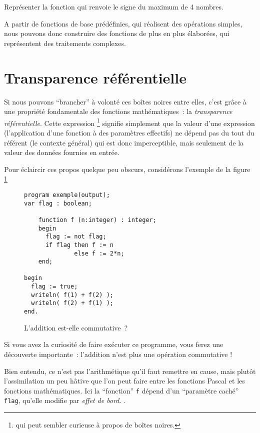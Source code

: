 \begin{exercice} Représenter la fonction qui renvoie le signe 
du maximum de 4 nombres.
\end{exercice}

A partir de fonctions de base prédéfinies, qui réalisent des
opérations simples, nous pouvons donc construire des fonctions de plus
en plus élaborées, qui représentent des traitements complexes.


\section{Transparence référentielle}

Si nous pouvons ``brancher'' à volonté ces boîtes noires entre
elles, c'est grâce à une propriété fondamentale des fonctions
mathématiques~: la {\em transparence
référentielle}.  Cette expression
\footnote{qui peut sembler curieuse à propos de boîtes noires.}
signifie simplement que la valeur d'une expression (l'application
d'une fonction à des paramètres effectifs) ne dépend pas du tout
du référent (le contexte général) qui est donc imperceptible, mais
seulement de la valeur des données fournies en entrée.

Pour éclaircir ces propos quelque peu obscurs, 
considérons l'exemple de la figure \ref{ExempleTrompeur}

\begin{figure}[htb]
\barre
\begin{verbatim}
program exemple(output);
var flag : boolean;

    function f (n:integer) : integer;
    begin
      flag := not flag;
      if flag then f := n
              else f := 2*n;
    end;

begin
  flag := true;
  writeln( f(1) + f(2) );
  writeln( f(2) + f(1) );
end.
\end{verbatim}
\caption{L'addition est-elle commutative~?}
\barre
\label{ExempleTrompeur}
\end{figure}

Si vous avez la curiosité de faire exécuter ce programme, 
vous ferez une découverte  importante~: l'addition n'est plus une opération commutative !

Bien entendu, ce n'est pas l'arithmétique qu'il faut remettre en cause,
 mais plut\^ot l'assimilation un peu h\^ative que l'on peut faire 
entre les fonctions Pascal et les fonctions mathématiques. Ici la ``fonction'' {\tt f}
 dépend d'un ``paramètre caché''{ \tt flag}, qu'elle  modifie 
par {\em effet de bord}. .

